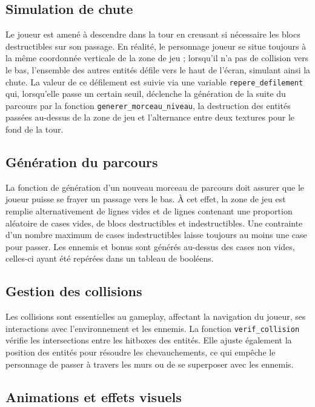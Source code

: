 \documentclass[a4paper,12pt]{article}
\begin{document}
\subsection{Simulation de chute}

Le joueur est amené à descendre dans la tour en creusant si nécessaire les blocs destructibles sur son passage.
En réalité, le personnage joueur se situe toujours à la même coordonnée verticale de la zone de jeu ; lorsqu’il n’a pas de collision vers le bas, l’ensemble des autres entités défile vers le haut de l’écran, simulant ainsi la chute.
La valeur de ce défilement est suivie via une variable \texttt{repere\_defilement} qui, lorsqu’elle passe un certain seuil, déclenche la génération de la suite du parcours par la fonction \texttt{generer\_morceau\_niveau}, la destruction des entités passées au-dessus de la zone de jeu et l’alternance entre deux textures pour le fond de la tour.

\subsection{Génération du parcours}
La fonction de génération d’un nouveau morceau de parcours doit assurer que le joueur puisse se frayer un passage vers le bas.
À cet effet, la zone de jeu est remplie alternativement de lignes vides et de lignes contenant une proportion aléatoire de cases vides, de blocs destructibles et indestructibles.
Une contrainte d’un nombre maximum de cases indestructibles laisse toujours au moins une case pour passer.
Les ennemis et bonus sont générés au-dessus des cases non vides, celles-ci ayant été repérées dans un tableau de booléens.

\subsection{Gestion des collisions}

Les collisions sont essentielles au gameplay, affectant la navigation du joueur, ses interactions avec l'environnement et les ennemis. La fonction \texttt{verif\_collision} vérifie les intersections entre les hitboxes des entités. Elle ajuste également la position des entités pour résoudre les chevauchements, ce qui empêche le personnage de passer à travers les murs ou de se superposer avec les ennemis.

\subsection{Animations et effets visuels}
\end{document}
